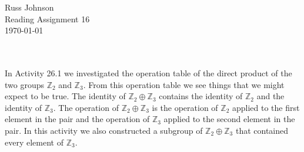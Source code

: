 \documentclass[11pt,a4paper]{article}
\begin{document}
\begin{flushright}
Russ Johnson\\
Reading Assignment 16\\
\today\\
\end{flushright}
~\\
~\\
In Activity 26.1 we investigated the operation table of the direct product of the two groups $\mathbb{Z}_2$ and $\mathbb{Z}_3$. From this operation table we see things that we might expect to be true. The identity of $\mathbb Z_2 \oplus \mathbb Z_3$ contains the identity of $\mathbb Z_2$ and the identity of $\mathbb Z_3$. The operation of $\mathbb Z_2\oplus \mathbb Z_3$ is the operation of $\mathbb Z_2$ applied to the first element in the pair and the operation of $\mathbb Z_3$ applied to the second element in the pair. In this activity we also constructed a subgroup of $\mathbb Z_2 \oplus \mathbb Z_3$ that contained every element of $\mathbb Z_3$.
\end{document}
